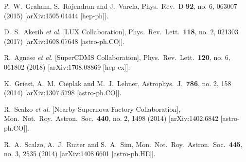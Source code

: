   P.~W.~Graham, S.~Rajendran and J.~Varela,
  Phys.\ Rev.\ D {\bf 92}, no. 6, 063007 (2015)
  [arXiv:1505.04444 [hep-ph]].


  D.~S.~Akerib {\it et al.} [LUX Collaboration],
  Phys.\ Rev.\ Lett.\  {\bf 118}, no. 2, 021303 (2017)
  [arXiv:1608.07648 [astro-ph.CO]].


  R.~Agnese {\it et al.} [SuperCDMS Collaboration],
  Phys.\ Rev.\ Lett.\  {\bf 120}, no. 6, 061802 (2018)
  [arXiv:1708.08869 [hep-ex]].


  K.~Griest, A.~M.~Cieplak and M.~J.~Lehner,
  Astrophys.\ J.\  {\bf 786}, no. 2, 158 (2014)
  [arXiv:1307.5798 [astro-ph.CO]].

  R.~Scalzo {\it et al.} [Nearby Supernova Factory Collaboration],
  Mon.\ Not.\ Roy.\ Astron.\ Soc.\  {\bf 440}, no. 2, 1498 (2014)
  [arXiv:1402.6842 [astro-ph.CO]].

  R.~A.~Scalzo, A.~J.~Ruiter and S.~A.~Sim,
  Mon.\ Not.\ Roy.\ Astron.\ Soc.\  {\bf 445}, no. 3, 2535 (2014)
  [arXiv:1408.6601 [astro-ph.HE]].

